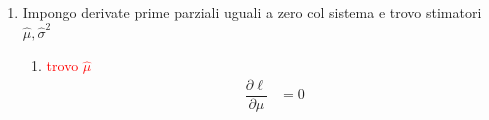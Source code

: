 \documentclass{article}  %
\theoremstyle{definition}
\begin{document}
\begin{esempio}
\begin{enumerate}
\begin{itemize}
\begin{align*}
				            \frac{\partial \ell}{\partial \sigma^2} & = \left(- \frac{n}{2} \ln \left({2 \pi}\right) - \frac{n}{2} \ln \left(\sigma^2\right) -\frac{1}{2\sigma^2} \sum \left(\left({x_i-\mu}\right)^2\right)\right)' \\
				                                                    & = 0 - \left(\frac{n}{2} \ln \left(\sigma^2\right)\right)' -  \left(\frac{1}{2\sigma^2} \sum \left(\left({x_i-\mu}\right)^2\right)\right)'                      \\
				                                                    & \text{ per evitare di impazzire impongo } \sigma^2=Y                                                                                                           \\
				                                                    & = - \left(\frac{n}{2} \ln \left(Y\right)\right)' -  \left(\frac{1}{2Y} \sum \left(\left({x_i-\mu}\right)^2\right)\right)'                                      \\
				                                                    & = - \frac{n}{2Y} + \frac{1}{2Y^2} \sum \left({x_i-\mu}\right)^2                                                                                                \\
				                                                    & \text{sostituisco } Y                                                                                                                                          \\
				                                                    & = - \frac{n}{2\sigma^2} + \frac{1}{2(\sigma^2)^2} \sum \left({x_i-\mu}\right)^2                                                                                \\
				                                                    & = \frac{1}{2\sigma^2} \left[-n + \frac{1}{\sigma^2} \sum \left({x_i-\mu}\right)^2 \right]
			            \end{align*}
		      \end{itemize}
		\item Impongo derivate prime parziali uguali a zero col sistema e trovo stimatori $\hat{\mu}, \hat{\sigma}^2$
		      \begin{enumerate}
			      \item \textcolor{red}{trovo $\hat{\mu}$}
			            \begin{align*}
				            \dfrac{\partial \ell}{\partial \mu}             & = 0                  \\

\end{align*}
\end{enumerate}
\end{enumerate}
\end{esempio}
\end{document}
